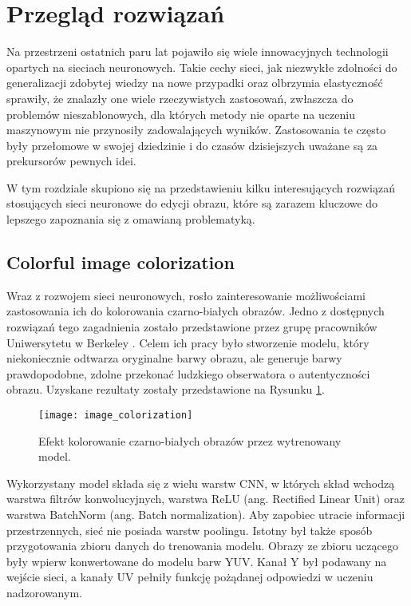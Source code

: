 \section[Przegląd rozwiązań (Bartosz Bieliński)]{Przegląd rozwiązań}

  Na przestrzeni ostatnich paru lat pojawiło się wiele innowacyjnych technologii opartych
  na sieciach neuronowych. Takie cechy sieci, jak niezwykłe zdolności do generalizacji
  zdobytej wiedzy na nowe przypadki oraz olbrzymia elastyczność sprawiły, że
  znalazły one wiele rzeczywistych zastosowań, zwłaszcza do problemów
  nieszablonowych, dla których metody nie oparte na uczeniu maszynowym
  nie przynosiły zadowalających wyników. Zastosowania te często były
  przełomowe w swojej dziedzinie i do czasów dzisiejszych uważane są
  za prekursorów pewnych idei.

  W tym rozdziale skupiono się na przedstawieniu kilku interesujących rozwiązań
  stosujących sieci neuronowe do edycji obrazu, które są zarazem kluczowe do lepszego
  zapoznania się z omawianą problematyką.

  \subsection{Colorful image colorization}

    Wraz z rozwojem sieci neuronowych, rosło zainteresowanie możliwościami zastosowania
    ich do kolorowania czarno-białych obrazów. Jedno z dostępnych rozwiązań tego
    zagadnienia zostało przedstawione przez grupę pracowników Uniwersytetu w
    Berkeley \cite{colorful_image_colorization}. Celem ich pracy było stworzenie
    modelu, który niekoniecznie odtwarza oryginalne barwy obrazu, ale generuje
    barwy prawdopodobne, zdolne przekonać ludzkiego obserwatora o autentyczności
    obrazu. Uzyskane rezultaty zostały przedstawione na
    Rysunku \ref{fig:colorful_image_colorization}.

    \begin{figure}[ht]
      \centering
      \texttt{[image: image\_colorization]}
      \caption[Efekt kolorowanie czarno-białych obrazów przez wytrenowany model - źródło:
      \cite{colorful_image_colorization}]{Efekt kolorowanie czarno-białych obrazów przez wytrenowany model.}
      \label{fig:colorful_image_colorization}
    \end{figure}

    Wykorzystany model składa się z wielu warstw CNN, w których skład wchodzą
    warstwa filtrów konwolucyjnych, warstwa ReLU (ang. Rectified
    Linear Unit) oraz warstwa BatchNorm (ang. Batch normalization).
    Aby zapobiec utracie informacji przestrzennych, sieć nie posiada warstw poolingu.
    Istotny był także sposób
    przygotowania zbioru danych do trenowania modelu. Obrazy ze zbioru uczącego
    były wpierw konwertowane do modelu barw YUV. Kanał Y był podawany na
    wejście sieci, a kanały UV pełniły funkcję pożądanej odpowiedzi w uczeniu
    nadzorowanym.

